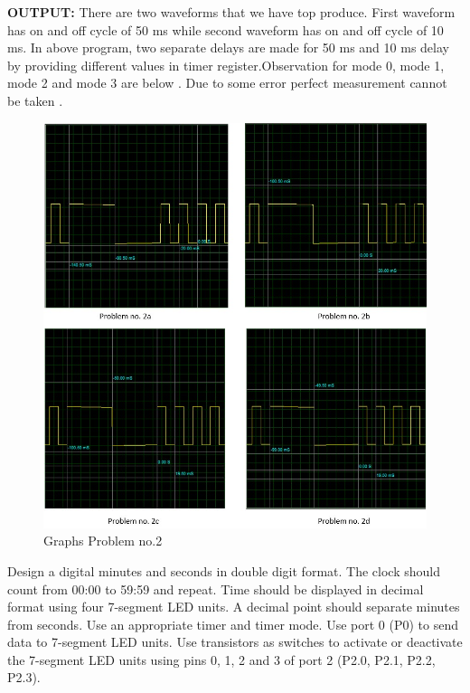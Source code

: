 \documentclass{article}
\begin{document}
\textbf{OUTPUT:}
There are two waveforms that we have top produce. First waveform has on and off cycle of 50 ms while second waveform has on and off cycle of 10 ms. In above program, two separate delays are made for 50 ms and 10 ms delay by providing different values in timer register.Observation for mode 0, mode 1, mode 2 and  mode 3 are below . Due to some error perfect measurement cannot be taken .
\begin{figure}[H]
    \centering
    \includegraphics[scale=1,cframe=blue 0.5pt 3pt]{prob2 graph.jpg}
    \caption{Graphs Problem no.2}
\end{figure}




\pagebreak

\begin{Q}
    {
        Design a digital minutes and seconds in double digit format. The clock should count from 00:00 to 59:59 and repeat. Time should be displayed in decimal format using four 7-segment LED units. A decimal point should separate minutes from seconds. Use an appropriate timer and timer mode. Use port 0 (P0) to send data to 7-segment LED units. Use transistors as switches to activate or deactivate the 7-segment LED units using pins 0, 1, 2 and 3 of port 2 (P2.0, P2.1, P2.2, P2.3).
    }
\end{Q}
\end{document}
